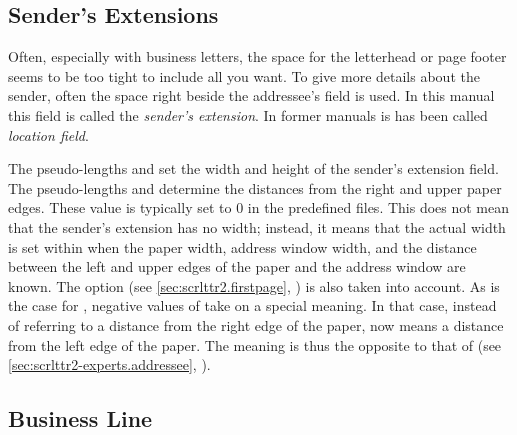 \subsection{Sender's Extensions}
\BeginIndexGroup
{}

Often, especially with business letters, the space for the letterhead or page
footer seems to be too tight to include all you want. To give more details
about the sender, often the space right beside the addressee's field is
used. In this manual this field is called the \emph{sender's extension}. In
former manuals is has been called \emph{location field}.

\begin{Declaration}
\end{Declaration}
The pseudo-lengths  and
 set the width and
height of the sender's extension field. The pseudo-lengths 
and  determine the distances from the right and upper paper
edges. These value is typically set to 0 in the predefined 
files. This does not mean that the sender's extension has
no width; instead, it means that the actual width is set within
 when the paper width, address window width, and
the distance between the left and upper edges of the paper and the address
window are known. The option  (see
\autoref{sec:scrlttr2.firstpage}, ) is
also taken into account. As is the case for , negative
values of  take on a special meaning. In that case, instead
of referring to a distance from the right edge of the paper, 
now means a distance from the left edge of the paper. The meaning is thus the
opposite to that of  (see
\autoref{sec:scrlttr2-experts.addressee},
).%
%
\EndIndexGroup
%
\EndIndexGroup


\subsection{Business Line}
%
\BeginIndexGroup
{}

